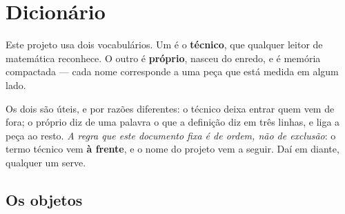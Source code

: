 
\section{Dicionário}
\label{sec:dicionario}

Este projeto usa dois vocabulários. Um é o \textbf{técnico}, que qualquer leitor de matemática
reconhece. O outro é \textbf{próprio}, nasceu do enredo, e é memória compactada --- cada nome
corresponde a uma peça que está medida em algum lado.

Os dois são úteis, e por razões diferentes: o técnico deixa entrar quem vem de fora; o próprio
diz de uma palavra o que a definição diz em três linhas, e liga a peça ao resto. \emph{A regra
que este documento fixa é de ordem, não de exclusão}: o termo técnico vem \textbf{à frente}, e o
nome do projeto vem a seguir. Daí em diante, qualquer um serve.

\subsection{Os objetos}

